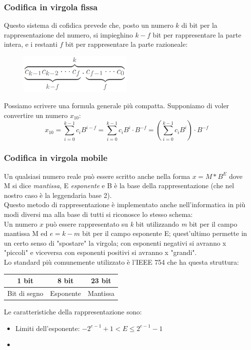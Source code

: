 \subsubsection{Codifica in virgola fissa} Questo sistema di cofidica prevede che, posto un numero $k$ di bit per la rappresentazione del numero, si impieghino $k-f$ bit per rappresentare la parte intera, e i restanti $f$ bit per rappresentare la parte razioneale:
\begin{figure}[H]
	\centering
	\includegraphics[width=0.5\textwidth,keepaspectratio]{images/fixed_point.png}
\end{figure}
 Possiamo scrivere una formula generale più compatta. Supponiamo di voler convertire un numero $x_{10}$:
 \begin{equation*}
 x_{10}=\sum_{i=0}^{k-1} c_{i}B^{i-f}=\sum_{i=0}^{k-1} c_{i}B^{i}\cdot B^{-f}=(\sum_{i=0}^{k-1} c_{i}B^{i})\cdot B^{-f}
 \end{equation*}

\subsubsection{Codifica in virgola mobile}
Un qualsiasi numero reale può essere scritto anche nella forma $x=M*B^{E}$ dove M si dice \textit{mantissa}, E \textit{esponente} e B è la base della rappresentazione (che nel nostro caso è la leggendaria base 2).\\
Questo metodo di rappresentazione è implementato anche nell'informatica in più modi diversi ma alla base di tutti si riconosce lo stesso schema: \\
Un numero $x$ può essere rappresentato su \textit{k} bit utilizzando \textit{m} bit per il campo mantissa M ed $e=k-m$ bit per il campo esponente E; quest'ultimo permette in un certo senso di "spostare" la virgola; con esponenti negativi si avranno x "piccoli" e viceversa con esponenti positivi si avranno x "grandi".\\
Lo standard più comunemente utilizzato è l'IEEE 754 che ha questa struttura:
\begin{table}[h!]
	\centering
	\begin{tabular}{|l|l|l|}
		\hline
		\multicolumn{1}{|c|}{1 bit} & \multicolumn{1}{c|}{8 bit} & \multicolumn{1}{c|}{23 bit} \\ \hline
		Bit di segno                & Esponente                  & Mantissa                    \\ \hline
	\end{tabular}
\end{table}

Le caratteristiche della rappresentazione sono:
\begin{itemize}
	\item Limiti dell'esponente: $-2^{e-1}+1 < E \le 2^{e-1}-1$
	\item 
\end{itemize}
